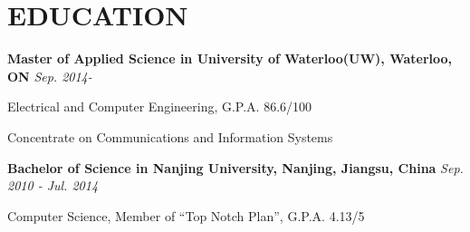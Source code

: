 \documentclass{res}
\newcommand{\parsp}{\vspace{-0.7\baselineskip}}
\newcommand{\additemindent}{\addtolength{\itemindent}{1em}}
\begin{document}
\begin{resume}
\begin{asparaenum}
\end{asparaenum}

\parsp
\section{EDUCATION}
	\textbf{Master of Applied Science in University of Waterloo(UW), Waterloo, ON} \hfill \emph{Sep. 2014-}
	\begin{asparaitem}[$\circ$]
		\additemindent
		\item Electrical and Computer Engineering, G.P.A. 86.6/100
		\item Concentrate on Communications and Information Systems
  	\end{asparaitem}

  	\vspace{-0.7\baselineskip}

	\textbf{Bachelor of Science in Nanjing University, Nanjing, Jiangsu, China}  \emph{Sep. 2010 - Jul. 2014}
	\begin{asparaitem}[$\circ$]
		\additemindent 
		\item Computer Science, Member of ``Top Notch Plan'', G.P.A. 4.13/5
	\end{asparaitem}




\end{resume}
\end{document}

